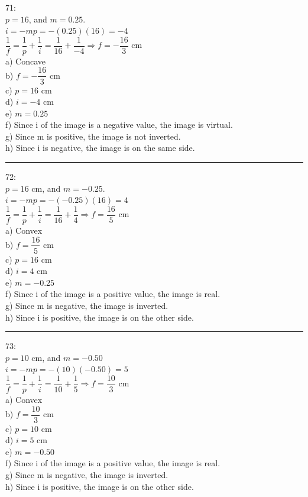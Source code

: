 \documentclass[fleqn]{article}
\begin{document}
\begin{enumerate}
    \textcolor{hwColor}{
      71: \\
      $p=16$, and $m=0.25$. \\
      $i=-mp=-(0.25)(16)=-4$ \\
      $\dfrac{1}{f}=\dfrac{1}{p}+\dfrac{1}{i}=\dfrac{1}{16}+\dfrac{1}{-4} \Longrightarrow f=-\dfrac{16}{3}$ cm \\
      a) Concave \\
      b) $f=-\dfrac{16}{3}$ cm \\
      c) $p=16$ cm \\
      d) $i=-4$ cm \\
      e) $m=0.25$ \\
      f) Since i of the image is a negative value, the image is virtual.\\
      g) Since m is positive, the image is not inverted. \\
      h) Since i is negative, the image is on the same side. \\
    }

    \textcolor{hwColor}{
      \rule{15cm}{0.4pt}
    }

    \textcolor{hwColor}{
      72: \\
      $p=16$ cm, and $m=-0.25$. \\
      $i=-mp=-(-0.25)(16)=4$ \\
      $\dfrac{1}{f}=\dfrac{1}{p}+\dfrac{1}{i}=\dfrac{1}{16}+\dfrac{1}{4} \Longrightarrow f=\dfrac{16}{5}$ cm \\
      a) Convex \\
      b) $f=\dfrac{16}{5}$ cm \\
      c) $p=16$ cm \\
      d) $i=4$ cm \\
      e) $m=-0.25$ \\
      f) Since i of the image is a positive value, the image is real. \\
      g) Since m is negative, the image is inverted. \\
      h) Since i is positive, the image is on the other side. \\
    }

    \textcolor{hwColor}{
      \rule{15cm}{0.4pt}
    }

    \textcolor{hwColor}{
      73: \\
      $p=10$ cm, and $m=-0.50$  \\
      $i=-mp=-(10)(-0.50)=5$ \\
      $\dfrac{1}{f}=\dfrac{1}{p}+\dfrac{1}{i}=\dfrac{1}{10}+\dfrac{1}{5} \Longrightarrow f=\dfrac{10}{3}$ cm \\
      a) Convex \\
      b) $f=\dfrac{10}{3}$ cm \\
      c) $p=10$ cm \\
      d) $i=5$ cm \\
      e) $m=-0.50$ \\
      f) Since i of the image is a positive value, the image is real. \\
      g) Since m is negative, the image is inverted. \\
      h) Since i is positive, the image is on the other side. \\
    }


\end{enumerate}
\end{document}
